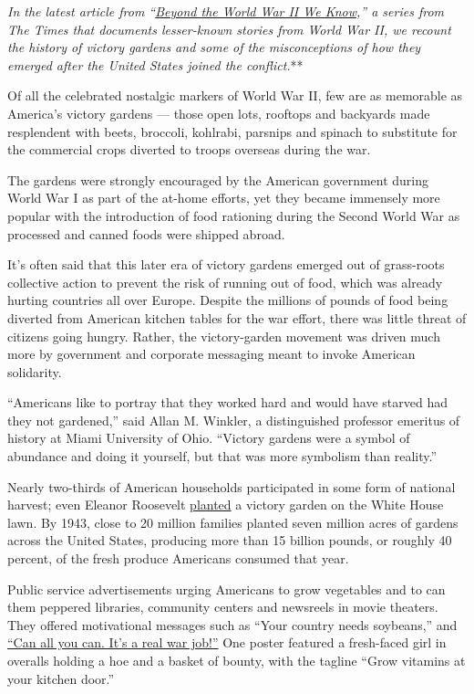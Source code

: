\emph{\emph{\emph{In the latest article from
``}\href{https://www.nytimes.com/spotlight/beyond-wwii}{\emph{Beyond the
World War II We Know}}},'' a series from The Times that documents
lesser-known stories from World War II, we recount the history of
victory gardens and some of the misconceptions of how they emerged after
the United States joined the conflict.}**

Of all the celebrated nostalgic markers of World War II, few are as
memorable as America's victory gardens --- those open lots, rooftops and
backyards made resplendent with beets, broccoli, kohlrabi, parsnips and
spinach to substitute for the commercial crops diverted to troops
overseas during the war.

The gardens were strongly encouraged by the American government during
World War I as part of the at-home efforts, yet they became immensely
more popular with the introduction of food rationing during the Second
World War as processed and canned foods were shipped abroad.

It's often said that this later era of victory gardens emerged out of
grass-roots collective action to prevent the risk of running out of
food, which was already hurting countries all over Europe. Despite the
millions of pounds of food being diverted from American kitchen tables
for the war effort, there was little threat of citizens going hungry.
Rather, the victory-garden movement was driven much more by government
and corporate messaging meant to invoke American solidarity.

``Americans like to portray that they worked hard and would have starved
had they not gardened,'' said Allan M. Winkler, a distinguished
professor emeritus of history at Miami University of Ohio. ``Victory
gardens were a symbol of abundance and doing it yourself, but that was
more symbolism than reality.''

Nearly two-thirds of American households participated in some form of
national harvest; even Eleanor Roosevelt
\href{https://library.si.edu/exhibition/cultivating-americas-gardens/gardening-for-the-common-good}{planted}
a victory garden on the White House lawn. By 1943, close to 20 million
families planted seven million acres of gardens across the United
States, producing more than 15 billion pounds, or roughly 40 percent, of
the fresh produce Americans consumed that year.

Public service advertisements urging Americans to grow vegetables and to
can them peppered libraries, community centers and newsreels in movie
theaters. They offered motivational messages such as ``Your country
needs soybeans,'' and
\href{https://www.history.nd.gov/exhibits/gardening/militaryevents16.html}{``Can
all you can. It's a real war job!''} One poster featured a fresh-faced
girl in overalls holding a hoe and a basket of bounty, with the tagline
``Grow vitamins at your kitchen door.''

